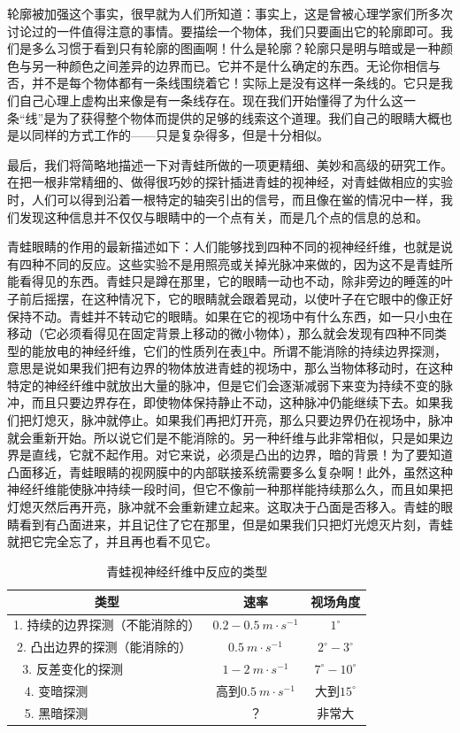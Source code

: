 轮廓被加强这个事实，很早就为人们所知道：事实上，这是曾被心理学家们所多次讨论过的一件值得注意的事情。要描绘一个物体，我们只要画出它的轮廓即可。我们是多么习惯于看到只有轮廓的图画啊！什么是轮廓？轮廓只是明与暗或是一种颜色与另一种颜色之间差异的边界而已。它并不是什么确定的东西。无论你相信与否，并不是每个物体都有一条线围绕着它！实际上是没有这样一条线的。它只是我们自己心理上虚构出来像是有一条线存在。现在我们开始懂得了为什么这一条“线”是为了获得整个物体而提供的足够的线索这个道理。我们自己的眼睛大概也是以同样的方式工作的——只是复杂得多，但是十分相似。

最后，我们将简略地描述一下对青蛙所做的一项更精细、美妙和高级的研究工作。在把一根非常精细的、做得很巧妙的探针插进青蛙的视神经，对青蛙做相应的实验时，人们可以得到沿着一根特定的轴突引出的信号，而且像在鲎的情况中一样，我们发现这种信息并不仅仅与眼睛中的一个点有关，而是几个点的信息的总和。

青蛙眼睛的作用的最新描述如下：人们能够找到四种不同的视神经纤维，也就是说有四种不同的反应。这些实验不是用照亮或关掉光脉冲来做的，因为这不是青蛙所能看得见的东西。青蛙只是蹲在那里，它的眼睛一动也不动，除非旁边的睡莲的叶子前后摇摆，在这种情况下，它的眼睛就会跟着晃动，以使叶子在它眼中的像正好保持不动。青蛙并不转动它的眼睛。如果在它的视场中有什么东西，如一只小虫在移动（它必须看得见在固定背景上移动的微小物体），那么就会发现有四种不同类型的能放电的神经纤维，它们的性质列在表\ref{Table:36:1}中。所谓不能消除的持续边界探测，意思是说如果我们把有边界的物体放进青蛙的视场中，那么当物体移动时，在这种特定的神经纤维中就放出大量的脉冲，但是它们会逐渐减弱下来变为持续不变的脉冲，而且只要边界存在，即使物体保持静止不动，这种脉冲仍能继续下去。如果我们把灯熄灭，脉冲就停止。如果我们再把灯开亮，那么只要边界仍在视场中，脉冲就会重新开始。所以说它们是不能消除的。另一种纤维与此非常相似，只是如果边界是直线，它就不起作用。对它来说，必须是凸出的边界，暗的背景！为了要知道凸面移近，青蛙眼睛的视网膜中的内部联接系统需要多么复杂啊！此外，虽然这种神经纤维能使脉冲持续一段时间，但它不像前一种那样能持续那么久，而且如果把灯熄灭然后再开亮，脉冲就不会重新建立起来。这取决于凸面是否移入。青蛙的眼睛看到有凸面进来，并且记住了它在那里，但是如果我们只把灯光熄灭片刻，青蛙就把它完全忘了，并且再也看不见它。

\begin{table}[!ht]
    \centering
    \caption{青蛙视神经纤维中反应的类型}
    \label{Table:36:1}
    \begin{tabular}{|c|c|c|}
    \hline
        类型 & 速率 & 视场角度  \\ \hline
        1. 持续的边界探测（不能消除的） & $0.2-0.5~m\cdot s^{-1}$ & $1^\circ$  \\ \hline
        2. 凸出边界的探测（能消除的）$~~$ & $0.5~m\cdot s^{-1}$ & $2^\circ - 3^\circ$  \\ \hline
        3. 反差变化的探测$~~~~~~~~~~~~~~~~~~~~~~~~~$ & $1-2~m\cdot s^{-1}$ & $7^\circ - 10^\circ$  \\ \hline
        4. 变暗探测$~~~~~~~~~~~~~~~~~~~~~~~~~~~~~~~~~~~~~$ & 高到$0.5~m\cdot s^{-1}$ & 大到$15^\circ$  \\ \hline
        5. 黑暗探测$~~~~~~~~~~~~~~~~~~~~~~~~~~~~~~~~~~~~~$ & ？ & 非常大  \\ \hline
    \end{tabular}
\end{table}

